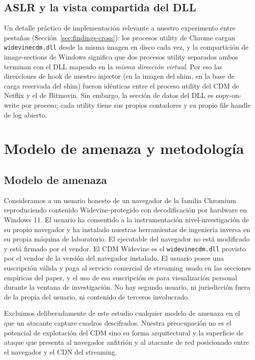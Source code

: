 \documentclass[11pt,letterpaper]{article}
\let\oldsection\section
\renewcommand{\section}{\clearpage\oldsection}
\begin{document}
\subsection{ASLR y la vista compartida del DLL}
\label{sec:bg-aslr}

Un detalle práctico de implementación relevante a nuestro
experimento entre pestañas (Sección~\ref{sec:findings-cross}):
los procesos utility de Chrome cargan
\texttt{widevinecdm.dll} desde la misma imagen en disco cada vez,
y la compartición de image-sections de Windows significa que dos
procesos utility separados ambos terminan con el DLL mapeado en
la \emph{misma dirección virtual}. Por eso las direcciones de
hook de nuestro injector (en la imagen del shim, en la base de
carga reservada del shim) fueron idénticas entre el proceso
utility del CDM de Netflix y el de Bitmovin. Sin embargo, la
sección de datos del DLL es copy-on-write por proceso; cada
utility tiene sus propios contadores y su propio file handle de
log abierto.

\section{Modelo de amenaza y metodología}
\label{sec:threat}

\subsection{Modelo de amenaza}
\label{sec:threat-model}

Consideramos a un usuario honesto de un navegador de la familia
Chromium reproduciendo contenido Widevine-protegido con
decodificación por hardware en Windows 11. El usuario ha
consentido a la instrumentación nivel-investigación de su propio
navegador y ha instalado nuestras herramientas de ingeniería
inversa en su propia máquina de laboratorio. El ejecutable del
navegador no está modificado y está firmado por el vendor. El CDM
Widevine es el \texttt{widevinecdm.dll} provisto por el vendor de
la versión del navegador instalado. El usuario posee una
suscripción válida y paga al servicio comercial de streaming
usado en las secciones empíricas del paper, y el uso de esa
suscripción es para visualización personal durante la ventana de
investigación. No hay segundo usuario, ni jurisdicción fuera de la
propia del usuario, ni contenido de terceros involucrado.

Excluimos deliberadamente de este estudio cualquier modelo de
amenaza en el que un atacante capture cuadros descifrados.
Nuestra preocupación no es el potencial de explotación del CDM
sino su forma arquitectural y la superficie de ataque que
presenta al navegador anfitrión y al atacante de red posicionado
entre el navegador y el CDN del streaming.
\end{document}
